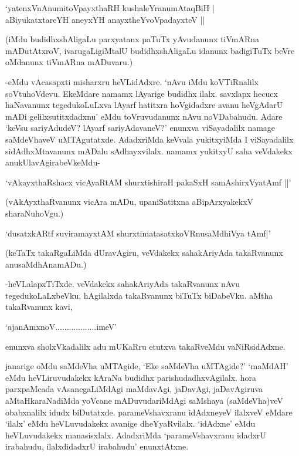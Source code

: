 \begin{shloka}
`yatenxVnAnumitoV\s payxthaRH kushaleYranumAtaqBiH |\\
aBiyukatxtareYH aneyxYH anayxtheYvoVpadayxteV ||
\end{shloka}

(iMdu budidhxshAligaLu parxyatanx paTuTx yAvudanunx tiVmARna mADutAtxroV, ivarugaLigiMtalU budidhxshAligaLu idanunx badigiTuTx beVre oMdanunx tiVmARna mADuvaru.)

-eMdu vAcasapxti misharxru heVLidAdxre. `nAvu iMdu koVTiRnalilx soVtuhoVdevu. EkeMdare namamx lAyarige budidhx ilalx. savxlapx hecucx haNavanunx tegedukoLuLxva lAyarf hatitxra hoVgidadxre avanu heVgAdarU mADi gelilxsutitxdadxnu' eMdu toVruvudanunx nAvu noVDabahudu. Adare `keVsu sariyAdudeV? lAyarf sariyAdavaneV?' enunxva viSayadalilx namage saMdeVhaveV uMTAgutatxde. AdadxriMda keVvala yukitxyiMda I viSayadalilx sidAdhxMtavanunx mADalu sAdhayxvilalx. namamx yukitxyU saha veVdakekx anukUlavAgirabeVkeMdu-

\begin{shloka}
`vAkayxthaRshacx vicAyaRtAM shurxtishiraH pakaSxH samAshirxVyatAmf ||'
\end{shloka}

(vAkAyxthaRvanunx vicAra mADu, upaniSatitxna aBipArxyakekxV sharaNuhoVgu.)

\begin{shloka}
`dusatxkARtf suviramayxtAM shurxtimatasatxkoVR\s nusaMdhiVya tAmf|'
\end{shloka}

(keTaTx takaRgaLiMda dUravAgiru, veVdakekx sahakAriyAda takaRvanunx anusaMdhAnamADu.)

-heVLalapxTiTxde. veVdakekx sahakAriyAda takaRvanunx nAvu tegedukoLaLxbeVku, hAgilalxda takaRvanunx biTuTx biDabeVku. aMtha takaRvanunx kavi,

\begin{shloka}
`ajanAmxnoV..................imeV'
\end{shloka}

enunxva sholxVkadalilx adu mUKaRru etutxva takaRveMdu vaNiRsidAdxne.

janarige oMdu saMdeVha uMTAgide, `Eke saMdeVha uMTAgide?' `maMdAH' eMdu heVLiruvudakekx kAraNa budidhx parishudadhxvAgilalx. hora parxpaMcada vAsanegaLiMdAgi maMdavAgi, jaDavAgi, jaDavAgiruva aMtaHkaraNadiMda yoVcane mADuvudariMdAgi saMshaya (saMdeVha)veV obabxnalilx idudx biDutatxde. parameVshavxranu idAdxneyeV ilalxveV eMdare `ilalx' eMdu heVLuvudakekx avanige dheYyaRvilalx. `idAdxne' eMdu heVLuvudakekx manasisxlalx. AdadxriMda `parameVshavxranu idadxrU irabahudu, ilalxdidadxrU irabahudu' enunxtAtxne.

